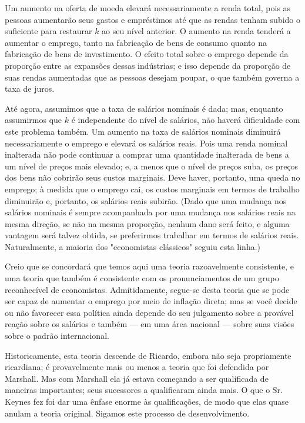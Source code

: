 \documentclass[12pt]{article}
\begin{document}
Um aumento na oferta de moeda elevará necessariamente a renda total, pois as pessoas aumentarão seus gastos e empréstimos até que as rendas tenham subido o suficiente para restaurar $k$ ao seu nível anterior. O aumento na renda tenderá a aumentar o emprego, tanto na fabricação de bens de consumo quanto na fabricação de bens de investimento. O efeito total sobre o emprego depende da proporção entre as expansões dessas indústrias; e isso depende da proporção de suas rendas aumentadas que as pessoas desejam poupar, o que também governa a taxa de juros.

Até agora, assumimos que a taxa de salários nominais é dada; mas, enquanto assumirmos que $k$ é independente do nível de salários, não haverá dificuldade com este problema também. Um aumento na taxa de salários nominais diminuirá necessariamente o emprego e elevará os salários reais. Pois uma renda nominal inalterada não pode continuar a comprar uma quantidade inalterada de bens a um nível de preços mais elevado; e, a menos que o nível de preços suba, os preços dos bens não cobrirão seus custos marginais. Deve haver, portanto, uma queda no emprego; à medida que o emprego cai, os custos marginais em termos de trabalho diminuirão e, portanto, os salários reais subirão. (Dado que uma mudança nos salários nominais é sempre acompanhada por uma mudança nos salários reais na mesma direção, se não na mesma proporção, nenhum dano será feito, e alguma vantagem será talvez obtida, se preferirmos trabalhar em termos de salários reais. Naturalmente, a maioria dos "economistas clássicos" seguiu esta linha.)

Creio que se concordará que temos aqui uma teoria razoavelmente consistente, e uma teoria que também é consistente com os pronunciamentos de um grupo reconhecível de economistas. Admitidamente, segue-se desta teoria que se pode ser capaz de aumentar o emprego por meio de inflação direta; mas se você decide ou não favorecer essa política ainda depende do seu julgamento sobre a provável reação sobre os salários e também — em uma área nacional — sobre suas visões sobre o padrão internacional.

Historicamente, esta teoria descende de Ricardo, embora não seja propriamente ricardiana; é provavelmente mais ou menos a teoria que foi defendida por Marshall. Mas com Marshall ela já estava começando a ser qualificada de maneiras importantes; seus sucessores a qualificaram ainda mais. O que o Sr. Keynes fez foi dar uma ênfase enorme às qualificações, de modo que elas quase anulam a teoria original. Sigamos este processo de desenvolvimento.
\end{document}
